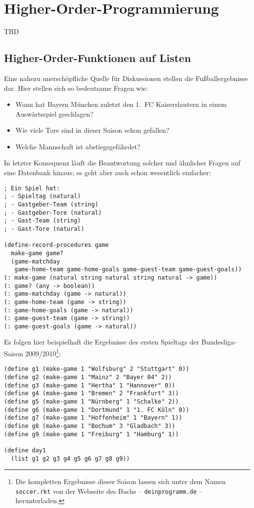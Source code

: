 
\chapter{Higher-Order-Programmierung}
\label{cha:higher-order}


TBD

\section{Higher-Order-Funktionen auf Listen}

Eine nahezu unerschöpfliche Quelle für Diskussionen stellen die
Fußballergebnisse dar.  Hier stellen sich so bedeutsame Fragen wie:
\begin{itemize}
\item Wann hat Bayern München zuletzt den 1.~FC Kaiserslautern in einem
  Auswärtsspiel geschlagen?
\item Wie viele Tore sind in dieser Saison schon gefallen?
\item Welche Mannschaft ist abstiegsgefährdet?
\end{itemize}
In letzter Konsequenz läuft die Beantwortung solcher und ähnlicher Fragen auf
eine Datenbank hinaus; es geht aber auch schon wesentlich einfacher:

\begin{verbatim}
; Ein Spiel hat:
; - Spieltag (natural)
; - Gastgeber-Team (string)
; - Gastgeber-Tore (natural)
; - Gast-Team (string)
; - Gast-Tore (natural)

(define-record-procedures game
  make-game game?
  (game-matchday 
   game-home-team game-home-goals game-guest-team game-guest-goals))
(: make-game (natural string natural string natural -> game))
(: game? (any -> boolean))
(: game-matchday (game -> natural))
(: game-home-team (game -> string))
(: game-home-goals (game -> natural))
(: game-guest-team (game -> string))
(: game-guest-goals (game -> natural))
\end{verbatim}

Es folgen hier beispielhaft die Ergebnisse des ersten Spieltags der Bundesliga-Saison
2009/2010\footnote{Die kompletten Ergebnisse dieser Saison lassen sich unter dem Namen
\texttt{soccer.rkt} von der Webseite des Buchs -- \texttt{deinprogramm.de} --
herunterladen.}:
\begin{verbatim}
(define g1 (make-game 1 "Wolfsburg" 2 "Stuttgart" 0))
(define g2 (make-game 1 "Mainz" 2 "Bayer 04" 2))
(define g3 (make-game 1 "Hertha" 1 "Hannover" 0))
(define g4 (make-game 1 "Bremen" 2 "Frankfurt" 3))
(define g5 (make-game 1 "Nürnberg" 1 "Schalke" 2))
(define g6 (make-game 1 "Dortmund" 1 "1. FC Köln" 0))
(define g7 (make-game 1 "Hoffenheim" 1 "Bayern" 1))
(define g8 (make-game 1 "Bochum" 3 "Gladbach" 3))
(define g9 (make-game 1 "Freiburg" 1 "Hamburg" 1))

(define day1
  (list g1 g2 g3 g4 g5 g6 g7 g8 g9))
\end{verbatim}


